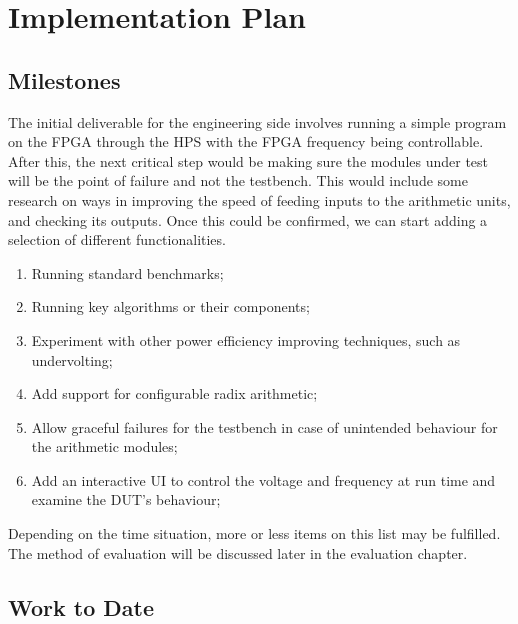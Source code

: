 \section{Implementation Plan}


\subsection{Milestones}
The initial deliverable for the engineering side involves running a simple
program on the FPGA through the HPS with the FPGA frequency being controllable.
After this, the next critical step would be making sure the modules under test
will be the point of failure and not the testbench.
This would include some research on ways in improving the speed of feeding
inputs to the arithmetic units, and checking its outputs.
Once this could be confirmed, we can start adding a selection of different functionalities.

\begin{enumerate}
  \item Running standard benchmarks;
  \item Running key algorithms or their components;
  \item Experiment with other power efficiency improving techniques,
        such as undervolting;
  \item Add support for configurable radix arithmetic;
  \item Allow graceful failures for the testbench in case of unintended
        behaviour for the arithmetic modules;
  \item Add an interactive UI to control the voltage and frequency at run time
        and examine the DUT’s behaviour;
\end{enumerate}

Depending on the time situation, more or less items on this list may be fulfilled.
The method of evaluation will be discussed later in the evaluation chapter.

\subsection{Work to Date}